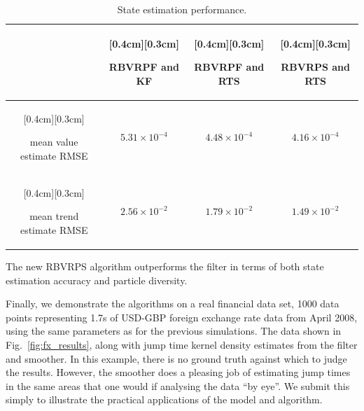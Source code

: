\documentclass[journal]{IEEEtran}
\newenvironment{meta}[0]{\color{red} \em}{}
\begin{document}
\begin{table}%
\caption{State estimation performance.}
\label{tab:state_performance}
\centering
\renewcommand{\arraystretch}{1.5}
\begin{tabular}{|c|c|c|c|}
\hline
 &\raisebox{0cm}[0.4cm][0.3cm]{\parbox[c]{1.5cm}{\centering RBVRPF and KF}} & \raisebox{0cm}[0.4cm][0.3cm]{\parbox[c]{1.5cm}{\centering RBVRPF and RTS}} & \raisebox{0cm}[0.4cm][0.3cm]{\parbox[c]{1.5cm}{\centering RBVRPS and RTS}} \\
\hline \hline
\raisebox{0cm}[0.4cm][0.3cm]{\parbox[c]{2cm}{\centering mean value estimate RMSE}}   & $5.31 \times 10^{-4}$ & $4.48 \times 10^{-4}$ & $4.16 \times 10^{-4}$ \\
\hline
\raisebox{0cm}[0.4cm][0.3cm]{\parbox[c]{2cm}{\centering mean trend estimate RMSE}}   & $2.56 \times 10^{-2}$ & $1.79 \times 10^{-2}$ & $1.49 \times 10^{-2}$ \\
\hline
\end{tabular}
\end{table}

The new RBVRPS algorithm outperforms the filter in terms of both state estimation accuracy and particle diversity.


Finally, we demonstrate the algorithms on a real financial data set, 1000 data points representing 1.7s of USD-GBP foreign exchange rate data from April 2008, using the same parameters as for the previous simulations. The data shown in Fig.~\ref{fig:fx_results}, along with jump time kernel density estimates from the filter and smoother. In this example, there is no ground truth against which to judge the results. However, the smoother does a pleasing job of estimating jump times in the same areas that one would if analysing the data ``by eye''. We submit this simply to illustrate the practical applications of the model and algorithm.
\end{document}

